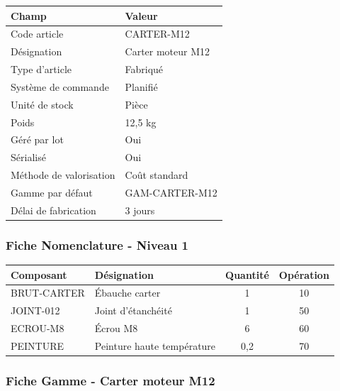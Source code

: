\documentclass{article}
\begin{document}
\begin{table}[h]
\begin{tcolorbox}[colback=vertclair, colframe=green!50!black, title=Exemple : Fiche article ERP - Carter moteur]
\begin{tabular}{|l|l|}
\hline
\textbf{Champ} & \textbf{Valeur} \\
\hline
Code article & \textsc{CARTER-M12} \\
Désignation & Carter moteur M12 \\
Type d'article & Fabriqué \\
Système de commande & Planifié \\
Unité de stock & Pièce \\
Poids & 12,5 kg \\
Géré par lot & Oui \\
Sérialisé & Oui \\
Méthode de valorisation & Coût standard \\
Gamme par défaut & \textsc{GAM-CARTER-M12} \\
Délai de fabrication & 3 jours \\
\hline
\end{tabular}
\end{tcolorbox}

\subsubsection{Fiche Nomenclature - Niveau 1}

\begin{tcolorbox}[colback=blueclair, colframe=blue!70!black, title=Exemple : Nomenclature - Carter moteur M12]
\begin{tabular}{|l|l|c|c|}
\hline
\textbf{Composant} & \textbf{Désignation} & \textbf{Quantité} & \textbf{Opération} \\
\hline
\textsc{BRUT-CARTER} & Ébauche carter & 1 & 10 \\
\textsc{JOINT-012} & Joint d'étanchéité & 1 & 50 \\
\textsc{ECROU-M8} & Écrou M8 & 6 & 60 \\
\textsc{PEINTURE} & Peinture haute température & 0,2 & 70 \\
\hline
\end{tabular}
\end{tcolorbox}

\subsubsection{Fiche Gamme - Carter moteur M12}


\end{table}
\end{document}
